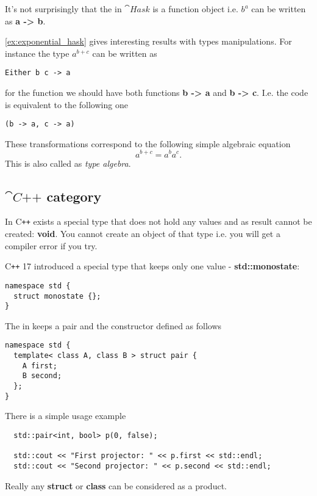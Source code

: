 \begin{example}
\label{ex:exponential_hask}
It's not surprisingly that the  in
$\cat{Hask}$ is a function object i.e. $b^a$ can be written as  
\textbf{a -> b}.
\end{example}

\begin{example}
\cref{ex:exponential_hask} gives interesting results with types
manipulations. For instance the type $a^{b+c}$ can be written as
\begin{verbatim}
Either b c -> a
\end{verbatim}
for the function we should have both functions 
\textbf{b -> a} and \textbf{b -> c}. I.e.
the code is equivalent to the following one
\begin{verbatim}
(b -> a, c -> a)
\end{verbatim}
These transformations correspond to the following simple algebraic
equation 
\[
a^{b+c} = a^b a^c.
\]
This is also called as \textit{type algebra}.
\end{example}

\subsection{$\cat{C\texttt{++}}$ category}
\begin{example}
\label{ex:cpp_initial_object}
In C\texttt{++} exists a special type that does not hold any values and as
result cannot be created: \textbf{void}.
You cannot create an object of that type i.e. you will get a compiler
error if you try.
\end{example}

\begin{example}
\label{ex:cpp_terminal_object}
C\texttt{++} 17 introduced a special type that keeps only one value -
\textbf{std::monostate}:  
\begin{verbatim}
namespace std {
  struct monostate {};
}
\end{verbatim}
\end{example}

\begin{example}
\label{ex:cpp_product}
The  in  keeps a
pair and the constructor defined as follows
\begin{verbatim}
namespace std {
  template< class A, class B > struct pair {
    A first;
    B second;
  };
}
\end{verbatim}

There is a simple usage example
\begin{verbatim}
  std::pair<int, bool> p(0, false);

  std::cout << "First projector: " << p.first << std::endl;
  std::cout << "Second projector: " << p.second << std::endl;

\end{verbatim}
Really any \textbf{struct} or \textbf{class} can be
considered as a product. 
\end{example}


